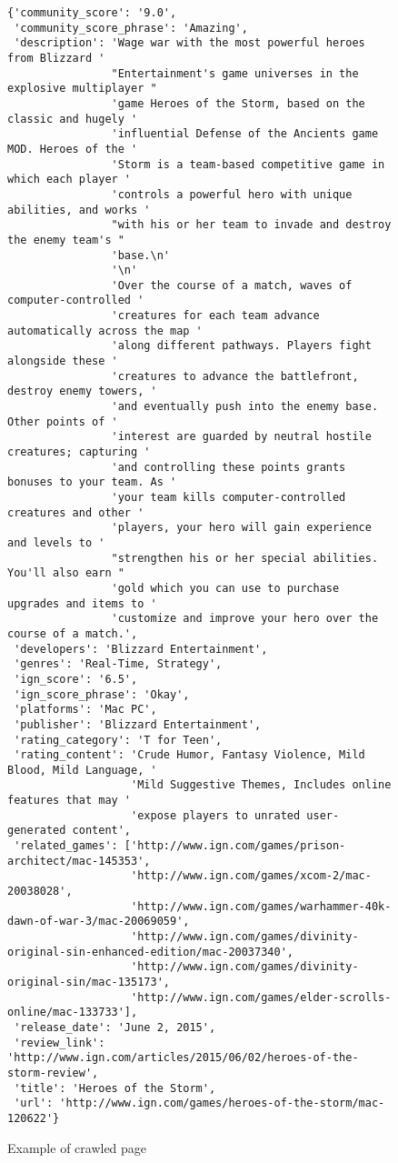 \documentclass{article}
\begin{document}
\begin{figure}[h]
\begin{verbatim}
{'community_score': '9.0',
 'community_score_phrase': 'Amazing',
 'description': 'Wage war with the most powerful heroes from Blizzard '
                "Entertainment's game universes in the explosive multiplayer "
                'game Heroes of the Storm, based on the classic and hugely '
                'influential Defense of the Ancients game MOD. Heroes of the '
                'Storm is a team-based competitive game in which each player '
                'controls a powerful hero with unique abilities, and works '
                "with his or her team to invade and destroy the enemy team's "
                'base.\n'
                '\n'
                'Over the course of a match, waves of computer-controlled '
                'creatures for each team advance automatically across the map '
                'along different pathways. Players fight alongside these '
                'creatures to advance the battlefront, destroy enemy towers, '
                'and eventually push into the enemy base. Other points of '
                'interest are guarded by neutral hostile creatures; capturing '
                'and controlling these points grants bonuses to your team. As '
                'your team kills computer-controlled creatures and other '
                'players, your hero will gain experience and levels to '
                "strengthen his or her special abilities. You'll also earn "
                'gold which you can use to purchase upgrades and items to '
                'customize and improve your hero over the course of a match.',
 'developers': 'Blizzard Entertainment',
 'genres': 'Real-Time, Strategy',
 'ign_score': '6.5',
 'ign_score_phrase': 'Okay',
 'platforms': 'Mac PC',
 'publisher': 'Blizzard Entertainment',
 'rating_category': 'T for Teen',
 'rating_content': 'Crude Humor, Fantasy Violence, Mild Blood, Mild Language, '
                   'Mild Suggestive Themes, Includes online features that may '
                   'expose players to unrated user-generated content',
 'related_games': ['http://www.ign.com/games/prison-architect/mac-145353',
                   'http://www.ign.com/games/xcom-2/mac-20038028',
                   'http://www.ign.com/games/warhammer-40k-dawn-of-war-3/mac-20069059',
                   'http://www.ign.com/games/divinity-original-sin-enhanced-edition/mac-20037340',
                   'http://www.ign.com/games/divinity-original-sin/mac-135173',
                   'http://www.ign.com/games/elder-scrolls-online/mac-133733'],
 'release_date': 'June 2, 2015',
 'review_link': 'http://www.ign.com/articles/2015/06/02/heroes-of-the-storm-review',
 'title': 'Heroes of the Storm',
 'url': 'http://www.ign.com/games/heroes-of-the-storm/mac-120622'}

\end{verbatim}
\caption{Example of crawled page}
\end{figure}
\end{document}
